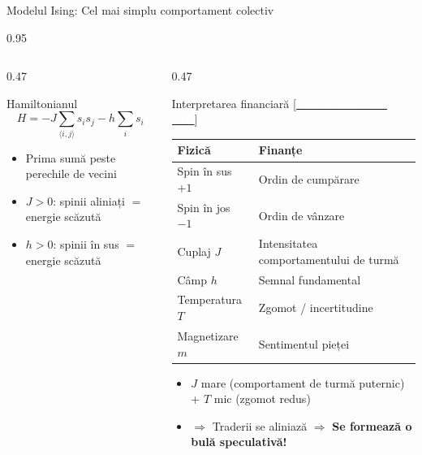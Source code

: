 \documentclass[9pt, aspectratio=169, t]{beamer}
\begin{document}
\begin{frame}{Modelul Ising: Cel mai simplu comportament colectiv}
\begin{cminipage}{0.95\textwidth}
{\begin{columns}[T]
\begin{column}{0.47\textwidth}
            \begin{alertblock}{Hamiltonianul}
                $$H = -J \sum_{\langle i,j \rangle} s_i s_j - h \sum_i s_i$$
                \begin{itemize}\setlength{\itemsep}{0pt}
                    \item Prima sumă peste perechile de vecini
                    \item $J > 0$: spinii aliniați $=$ energie scăzută
                    \item $h > 0$: spinii în sus $=$ energie scăzută
                \end{itemize}
            \end{alertblock}
        \end{column}
        \begin{column}{0.47\textwidth}
            \begin{exampleblock}{Interpretarea financiară {\scriptsize[\href{https://doi.org/10.1017/S1365100500015029}{\textcolor{white}{Cont \& Bouchaud, 2000}}]}}
                \begin{center}
                    \begin{tabular}{ll}
                        \toprule
                        \textbf{Fizică} & \textbf{Finanțe} \\
                        \midrule
                        Spin în sus $+1$ & Ordin de cumpărare \\
                        Spin în jos $-1$ & Ordin de vânzare \\
                        Cuplaj $J$ & Intensitatea comportamentului de turmă \\
                        Câmp $h$ & Semnal fundamental \\
                        Temperatura $T$ & Zgomot / incertitudine \\
                        Magnetizare $m$ & Sentimentul pieței \\
                        \bottomrule
                    \end{tabular}
                \end{center}
            \end{exampleblock}

            \begin{block}{}
                \begin{itemize}\setlength{\itemsep}{0pt}
                    \item $J$ mare (comportament de turmă puternic) + $T$ mic (zgomot redus)
                    \item $\Rightarrow$ Traderii se aliniază $\Rightarrow$ \textbf{Se formează o bulă speculativă!}
                \end{itemize}
            \end{block}
        \end{column}
    \end{columns}
    }
    \end{cminipage}
\end{frame}
\end{document}
